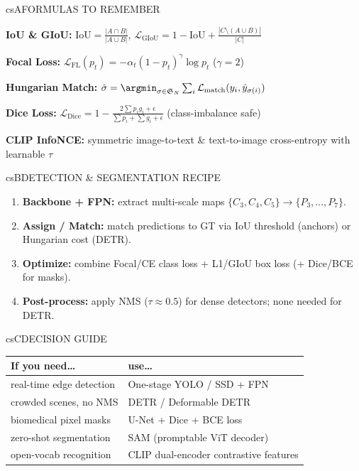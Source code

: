 \documentclass[../../../../master.tex]{subfiles}
\begin{document}
\begin{cscolumns}
\begin{cscard}{csA}{FORMULAS TO REMEMBER}
  \begin{csbul}
    \item \textbf{IoU \& GIoU:} $\mathrm{IoU}=\frac{|A\cap B|}{|A\cup B|}$, $\mathcal{L}_{\mathrm{GIoU}}=1-\mathrm{IoU}+\frac{|C\setminus(A\cup B)|}{|C|}$
    \item \textbf{Focal Loss:} $\mathcal{L}_{\mathrm{FL}}(p_t)=-\alpha_t(1-p_t)^\gamma\log p_t$ ($\gamma=2$)
    \item \textbf{Hungarian Match:} $\hat\sigma=\argmin_{\sigma\in\mathfrak S_N}\sum_i\mathcal{L}_{\mathrm{match}}(y_i,\hat y_{\sigma(i)})$
    \item \textbf{Dice Loss:} $\mathcal{L}_{\mathrm{Dice}} = 1 - \frac{2\sum p_i g_i + \epsilon}{\sum p_i + \sum g_i + \epsilon}$ (class-imbalance safe)
    \item \textbf{CLIP InfoNCE:} symmetric image-to-text \& text-to-image cross-entropy with learnable $\tau$
  \end{csbul}
\end{cscard}

\begin{cscard}{csB}{DETECTION \& SEGMENTATION RECIPE}
  \begin{enumerate}[leftmargin=1.2em, itemsep=1pt, topsep=1pt, parsep=0pt]
    \item \textbf{Backbone + FPN:} extract multi-scale maps $\{C_3,C_4,C_5\}\to\{P_3,\dots,P_7\}$.
    \item \textbf{Assign / Match:} match predictions to GT via IoU threshold (anchors) or Hungarian cost (DETR).
    \item \textbf{Optimize:} combine Focal/CE class loss + L1/GIoU box loss (+ Dice/BCE for masks).
    \item \textbf{Post-process:} apply NMS ($\tau\approx 0.5$) for dense detectors; none needed for DETR.
  \end{enumerate}
\end{cscard}
\columnbreak

\begin{cscard}{csC}{DECISION GUIDE}
  \renewcommand{\arraystretch}{1.18}\small
  \begin{tabular}{@{}>{\raggedright\arraybackslash}p{3.1cm}>{\raggedright\arraybackslash}p{4.6cm}@{}}
    \textbf{If you need\ldots} & \textbf{use\ldots}\\ \hline
    real-time edge detection & One-stage YOLO / SSD + FPN\\
    crowded scenes, no NMS & DETR / Deformable DETR\\
    biomedical pixel masks & U-Net + Dice + BCE loss\\
    zero-shot segmentation & SAM (promptable ViT decoder)\\
    open-vocab recognition & CLIP dual-encoder contrastive features\\
  \end{tabular}
\end{cscard}


\end{cscolumns}
\end{document}
